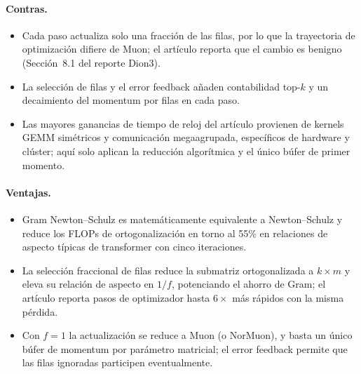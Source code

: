 \paragraph{Contras.}
\begin{itemize}[leftmargin=*]
\item Cada paso actualiza solo una fracción de las filas, por lo que la trayectoria de optimización difiere de Muon; el artículo reporta que el cambio es benigno (Sección~8.1 del reporte Dion3).
\item La selección de filas y el error feedback añaden contabilidad top-$k$ y un decaimiento del momentum por filas en cada paso.
\item Las mayores ganancias de tiempo de reloj del artículo provienen de kernels GEMM simétricos y comunicación megaagrupada, específicos de hardware y clúster; aquí solo aplican la reducción algorítmica y el único búfer de primer momento.
\end{itemize}

\paragraph{Ventajas.}
\begin{itemize}[leftmargin=*]
\item Gram Newton--Schulz es matemáticamente equivalente a Newton--Schulz y reduce los FLOPs de ortogonalización en torno al 55\% en relaciones de aspecto típicas de transformer con cinco iteraciones.
\item La selección fraccional de filas reduce la submatriz ortogonalizada a $k \times m$ y eleva su relación de aspecto en $1/f$, potenciando el ahorro de Gram; el artículo reporta pasos de optimizador hasta $6\times$ más rápidos con la misma pérdida.
\item Con $f = 1$ la actualización se reduce a Muon (o NorMuon), y basta un único búfer de momentum por parámetro matricial; el error feedback permite que las filas ignoradas participen eventualmente.
\end{itemize}


